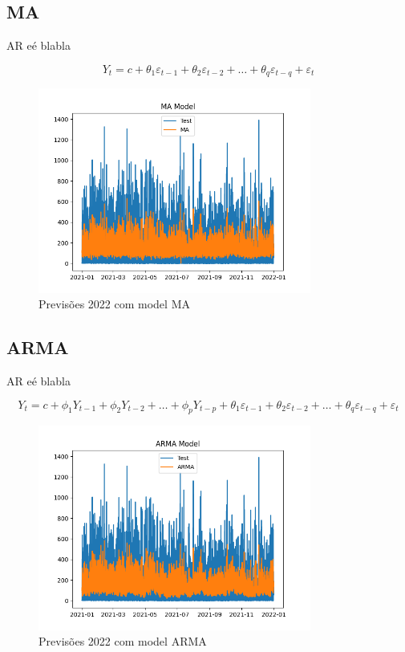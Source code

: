 \subsection{MA}

AR eé blabla

\begin{equation} \label{eq:MA} 
    Y_t = c + \theta_1 \varepsilon_{t-1} + \theta_2 \varepsilon_{t-2} + \dots + \theta_q \varepsilon_{t-q} + \varepsilon_t 
\end{equation}

\begin{figure}[H]
    \centering
    \includegraphics[width=0.8\textwidth]{../plots/MA_model.png}
    \caption{Previsões 2022 com model MA}
    \label{fig:MA_model}
\end{figure}
  
\subsection{ARMA}

AR eé blabla

\begin{equation} \label{eq:ARMA}  Y_t = c + \phi_1 Y_{t-1} + \phi_2 Y_{t-2} + \dots + \phi_p Y_{t-p} + \theta_1 \varepsilon_{t-1} + \theta_2 \varepsilon_{t-2} + \dots + \theta_q \varepsilon_{t-q} + \varepsilon_t  \end{equation}

\begin{figure}[H]
    \centering
    \includegraphics[width=0.8\textwidth]{../plots/ARMA_model.png}
    \caption{Previsões 2022 com model ARMA}
    \label{fig:ARMA_model}
\end{figure}

